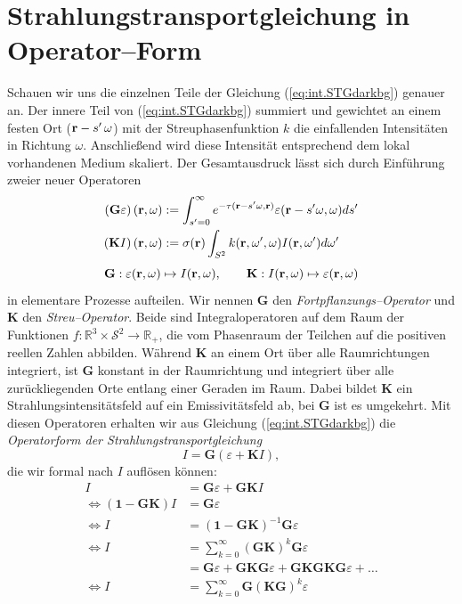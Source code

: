 	\section{Strahlungstransportgleichung in Operator--Form}
	Schauen wir uns die einzelnen Teile der Gleichung (\ref{eq:int.STGdarkbg}) genauer an.
	Der innere Teil von (\ref{eq:int.STGdarkbg}) summiert und gewichtet an einem festen Ort ($\mathbf{r}-s'\,\omega$) mit der Streuphasenfunktion $k$ die einfallenden Intensitäten in Richtung $\omega$. Anschließend wird diese Intensität entsprechend dem lokal vorhandenen Medium skaliert. 	Der Gesamtausdruck lässt sich durch Einführung zweier neuer Operatoren
	\begin{align*}
		\left(\mathbf{G}\varepsilon\right)(\mathbf{r},\omega)&:=\int_{s'=0}^\infty e^{-\tau(\mathbf{r}-s' \omega,\mathbf{r})}\varepsilon(\mathbf{r}-s' \omega,\omega) ds' \\
		\left(\mathbf{K}I\right)(\mathbf{r},\omega)&:=\sigma(\mathbf{r})\int_{S^2} k(\mathbf{r},\omega',\omega) I(\mathbf{r},\omega') d\omega'
	\end{align*}
	\begin{equation*}
		\mathbf{G} : \varepsilon(\mathbf{r},\omega) \mapsto I(\mathbf{r},\omega) , \qquad
		\mathbf{K} : I(\mathbf{r},\omega) \mapsto \varepsilon(\mathbf{r},\omega)
	\end{equation*}
	in elementare Prozesse aufteilen. Wir nennen $\mathbf{G}$ den {\em Fortpflanzungs--Operator} und $\mathbf{K}$ den {\em Streu--Operator}. Beide sind Integraloperatoren auf dem Raum der Funktionen $f : \mathbb{R}^3 \times \mathcal{S}^2 \to \mathbb{R}_+$, die vom Phasenraum der Teilchen auf die positiven reellen Zahlen abbilden. Während $\mathbf{K}$ an einem Ort über alle Raumrichtungen integriert, ist $\mathbf{G}$ konstant in der Raumrichtung und integriert über alle zurückliegenden Orte entlang einer Geraden im Raum. Dabei bildet $\mathbf{K}$ ein Strahlungsintensitätsfeld auf ein Emissivitätsfeld ab, bei $\mathbf{G}$ ist es umgekehrt.
	Mit diesen Operatoren erhalten wir aus Gleichung (\ref{eq:int.STGdarkbg}) die {\em Operatorform der Strahlungstransportgleichung}
	\begin{equation}
		I=\mathbf{G}(\varepsilon + \mathbf{K}I),
		\label{eq:op.STG}
	\end{equation}
	die wir formal nach $I$ auflösen können:
	\begin{align}
		I&=\mathbf{G}\varepsilon + \mathbf{GK}I \nonumber \\
		\Leftrightarrow (\mathbf{1}-\mathbf{GK})I &= \mathbf{G}\varepsilon \nonumber \\
		\Leftrightarrow I &= (\mathbf{1}-\mathbf{GK})^{-1}\mathbf{G}\varepsilon \label{eq:op.STGinvert} \\
		\Leftrightarrow I &= \sum_{k=0}^\infty (\mathbf{GK})^k \mathbf{G}\varepsilon \label{eq:op.STGneumann} \\
		&=\mathbf{G}\varepsilon + \mathbf{GKG}\varepsilon + \mathbf{GKGKG}\varepsilon + \hdots \label{eq:op.STGneumann.explicit} \\
		\Leftrightarrow I &=\sum_{k=0}^\infty \mathbf{G} (\mathbf{KG})^k \varepsilon \label{eq:op.STGkg}
	\end{align}
